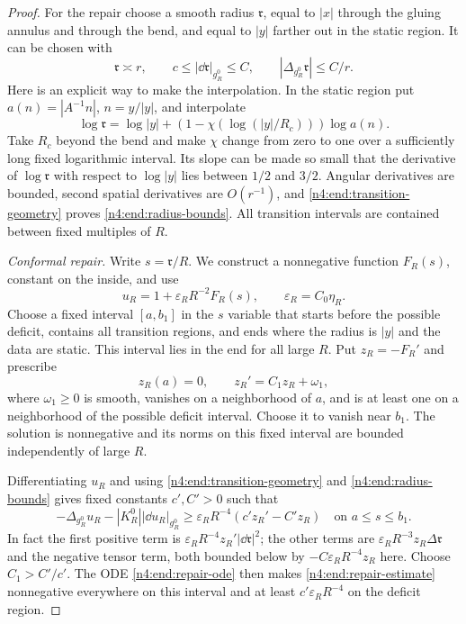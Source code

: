 \begin{proof}
For the repair choose a smooth radius \(\mathfrak r\), equal to
\(|x|\) through the gluing annulus and through the bend, and equal to
\(|y|\) farther out in the static region. It can be chosen with
\begin{equation}\label{n4:end:radius-bounds}
 \mathfrak r\asymp r,\qquad
 c\le|\dd\mathfrak r|_{g_R^0}\le C,
 \qquad |\Delta_{g_R^0}\mathfrak r|\le C/r.
\end{equation}
Here is an explicit way to make the interpolation. In the static region
put \(a(n)=|A^{-1}n|\), \(n=y/|y|\), and interpolate
\[
 \log\mathfrak r=\log|y|+(1-\chi(\log(|y|/R_c)))\log a(n).
\]
Take \(R_c\) beyond the bend and make \(\chi\) change from zero to one
over a sufficiently long fixed logarithmic interval. Its slope can be
made so small that the derivative of \(\log\mathfrak r\) with respect
to \(\log|y|\) lies between \(1/2\) and \(3/2\). Angular derivatives
are bounded, second spatial derivatives are \(O(r^{-1})\), and
\eqref{n4:end:transition-geometry} proves \eqref{n4:end:radius-bounds}.
All transition intervals are contained between fixed multiples of \(R\).

\smallskip
\noindent\emph{Conformal repair.} Write \(s=\mathfrak r/R\). We construct a nonnegative function
\(F_R(s)\), constant on the inside, and use
\[
 u_R=1+\varepsilon_RR^{-2}F_R(s),\qquad
 \varepsilon_R=C_0\eta_R.
\]
Choose a fixed interval \([a,b_1]\) in the \(s\) variable that starts
before the possible deficit, contains all transition regions, and ends
where the radius is \(|y|\) and the data are static. This interval lies
in the end for all large \(R\). Put \(z_R=-F_R'\) and prescribe
\begin{equation}\label{n4:end:repair-ode}
 z_R(a)=0,\qquad z_R'=C_1z_R+\omega_1,
\end{equation}
where \(\omega_1\ge0\) is smooth, vanishes on a neighborhood of \(a\),
and is at least one on a neighborhood of the possible deficit interval.
Choose it to vanish near \(b_1\). The solution is nonnegative and its
norms on this fixed interval are bounded independently of large \(R\).

Differentiating \(u_R\) and using \eqref{n4:end:transition-geometry} and
\eqref{n4:end:radius-bounds} gives fixed constants \(c',C'>0\) such that
\begin{equation}\label{n4:end:repair-estimate}
 -\Delta_{g_R^0}u_R-|K_R^0||\dd u_R|_{g_R^0}
 \ge\varepsilon_RR^{-4}(c'z_R'-C'z_R)
 \quad\text{on }a\le s\le b_1.
\end{equation}
In fact the first positive term is
\(\varepsilon_RR^{-4}z_R'|\dd\mathfrak r|^2\); the other terms are
\(\varepsilon_RR^{-3}z_R\Delta\mathfrak r\) and the negative tensor
term, both bounded below by \(-C\varepsilon_RR^{-4}z_R\) here.
Choose \(C_1>C'/c'\). The ODE \eqref{n4:end:repair-ode} then makes
\eqref{n4:end:repair-estimate} nonnegative everywhere on this interval
and at least \(c'\varepsilon_RR^{-4}\) on the deficit region.


\end{proof}
